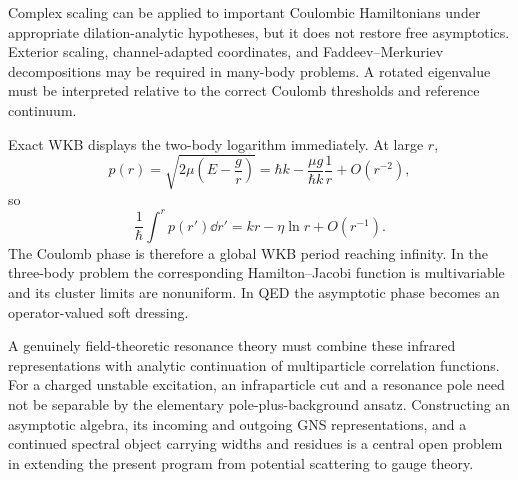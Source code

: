 Complex scaling can be applied to important Coulombic Hamiltonians under
appropriate dilation-analytic hypotheses, but it does not restore free
asymptotics.  Exterior scaling, channel-adapted coordinates, and
Faddeev--Merkuriev decompositions may be required in many-body problems.  A
rotated eigenvalue must be interpreted relative to the correct Coulomb
thresholds and reference continuum.

Exact WKB displays the two-body logarithm immediately.  At large $r$,
\begin{equation}
  p(r)
  =\sqrt{2\mu\left(E-\frac{g}{r}\right)}
  =\hbar k-\frac{\mu g}{\hbar k}\frac{1}{r}
  +O(r^{-2}),
  \label{eq:coulomb-WKB-momentum}
\end{equation}
so
\begin{equation}
  \frac{1}{\hbar}\int^r p(r')\dd r'
  =kr-\eta\ln r+O(r^{-1}).
  \label{eq:coulomb-WKB-log}
\end{equation}
The Coulomb phase is therefore a global WKB period reaching infinity.  In the
three-body problem the corresponding Hamilton--Jacobi function is
multivariable and its cluster limits are nonuniform.  In QED the asymptotic
phase becomes an operator-valued soft dressing.

A genuinely field-theoretic resonance theory must combine these infrared
representations with analytic continuation of multiparticle correlation
functions.  For a charged unstable excitation, an infraparticle cut and a
resonance pole need not be separable by the elementary pole-plus-background
ansatz.  Constructing an asymptotic algebra, its incoming and outgoing GNS
representations, and a continued spectral object carrying widths and residues
is a central open problem in extending the present program from potential
scattering to gauge theory.
